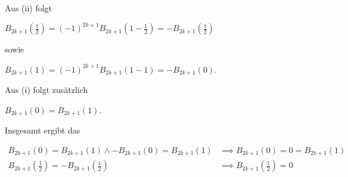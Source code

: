 \documentclass[]{article}
\begin{document}
Aus (ii) folgt

$B_{2k+1}(\frac{1}{2})=(-1)^{2k+1}B_{2k+1}(1-\frac{1}{2})=-B_{2k+1}(\frac{1}{2})$

sowie

$B_{2k+1}(1)=(-1)^{2k+1}B_{2k+1}(1-1)=-B_{2k+1}(0)$.

Aus (i) folgt zusätzlich

$B_{2k+1}(0) = B_{2k+1}(1)$.

Insgesamt ergibt das

\begin{align*}
	B_{2k+1}(0) = B_{2k+1}(1) \land - B_{2k+1}(0) = B_{2k+1}(1) &\implies B_{2k+1}(0) = 0 = B_{2k+1}(1) \\
	B_{2k+1}(\frac{1}{2}) = -B_{2k+1}(\frac{1}{2}) &\implies B_{2k+1}(\frac{1}{2}) = 0
\end{align*}
\end{document}
